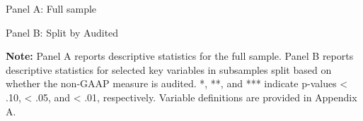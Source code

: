 \documentclass[12pt,fleqn]{article}
\begin{document}
\begin{table}[!htbp] 
    \begin{threeparttable}[b]
        \captionsetup{labelfont = bf, singlelinecheck = off, justification = raggedright, labelsep = none}   
        \caption{\\Descriptive Statistics}
        \small

        \begin{flushleft}        
        Panel A: Full sample    
        \end{flushleft}
        \vspace{-3mm}
        
        \begin{flushleft}
           {\raggedright
           
           \label{table:Descriptives}
           \par}
        \end{flushleft}

        \vspace{-6mm}
        \begin{flushleft}        
        Panel B: Split by Audited    
        \end{flushleft}
        \vspace{-3mm}
        
        \begin{flushleft}
           {\raggedright
           
           \label{table:Descriptives_by_audit}
           \par}
        \end{flushleft}

        \vspace{-6mm}
        \begin{tablenotes}
            \scriptsize
            \item \textbf{Note:} Panel A reports descriptive statistics for the full sample. Panel B reports descriptive statistics for selected key variables in subsamples split based on whether the non-GAAP measure is audited. *, **, and *** indicate p-values < .10, < .05, and < .01, respectively. Variable definitions are provided in Appendix A.
        \end{tablenotes}
    
    \end{threeparttable}
\end{table}
\end{document}

